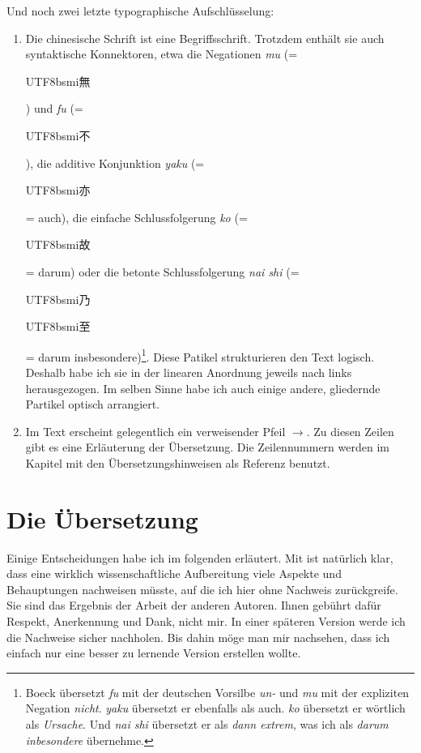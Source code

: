 \documentclass[
DIV=calc,
BCOR=5mm,
11pt,
headings=small,
oneside,
bibtotocnumbered]{scrartcl}
\newcommand{\cnbsmi}[1]{\begin{CJK}{UTF8}{bsmi}#1\end{CJK}}
\begin{document}
Und noch zwei letzte typographische Aufschlüsselung: 

\begin{enumerate}
  \item Die chinesische Schrift ist eine Begriffsschrift. Trotzdem enthält sie
  auch syntaktische Konnektoren, etwa die Negationen \emph{mu} (= \cnbsmi{無})
  und  \emph{fu} (= \cnbsmi{不}), die additive Konjunktion \emph{yaku} (=
  \cnbsmi{亦} = auch), die einfache Schlussfolgerung \emph{ko} (= \cnbsmi{故} =
  darum) oder die betonte Schlussfolgerung \emph{nai shi} (= \cnbsmi{乃}
  \cnbsmi{至} = darum insbesondere)\footnote{Boeck übersetzt \emph{fu} mit der
  deutschen Vorsilbe \emph{un-} und \emph{mu} mit der expliziten Negation
  \emph{nicht}. \emph{yaku} übersetzt er ebenfalls als auch. \emph{ko} übersetzt
  er wörtlich als \emph{Ursache}. Und \emph{nai shi} übersetzt er als \emph{dann
  extrem}, was ich als \emph{darum inbesondere}
  übernehme.\cite[vgl][\nopage]{Boeck2016a}}. Diese Patikel strukturieren den
  Text logisch. Deshalb habe ich sie in der linearen Anordnung jeweils nach
  links herausgezogen. Im selben Sinne habe ich auch einige andere, gliedernde
  Partikel optisch arrangiert.
  \item Im Text erscheint gelegentlich ein verweisender Pfeil
  \emph{$\rightarrow$}. Zu diesen Zeilen gibt es eine Erläuterung der
  Übersetzung. Die Zeilennummern werden im Kapitel mit den Übersetzungshinweisen
  als Referenz benutzt.
\end{enumerate}

\section{Die Übersetzung} 

Einige Entscheidungen habe ich im folgenden erläutert. Mit ist natürlich klar,
dass eine wirklich wissenschaftliche Aufbereitung viele Aspekte und Behauptungen
nachweisen müsste, auf die ich hier ohne Nachweis zurückgreife. Sie sind das
Ergebnis der Arbeit der anderen Autoren. Ihnen gebührt dafür Respekt,
Anerkennung und Dank, nicht mir. In einer späteren Version werde ich die
Nachweise sicher nachholen. Bis dahin möge man mir nachsehen, dass ich einfach
nur eine besser zu lernende Version erstellen wollte.
\end{document}
